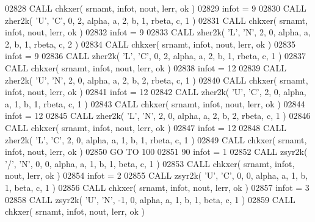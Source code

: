 \begin{DoxyCode}
02828       \textcolor{keyword}{CALL }chkxer( srnamt, infot, nout, lerr, ok )
02829       infot = 9
02830       \textcolor{keyword}{CALL }zher2k( \textcolor{stringliteral}{'U'}, \textcolor{stringliteral}{'C'}, 0, 2, alpha, a, 2, b, 1, rbeta, c, 1 )
02831       \textcolor{keyword}{CALL }chkxer( srnamt, infot, nout, lerr, ok )
02832       infot = 9
02833       \textcolor{keyword}{CALL }zher2k( \textcolor{stringliteral}{'L'}, \textcolor{stringliteral}{'N'}, 2, 0, alpha, a, 2, b, 1, rbeta, c, 2 )
02834       \textcolor{keyword}{CALL }chkxer( srnamt, infot, nout, lerr, ok )
02835       infot = 9
02836       \textcolor{keyword}{CALL }zher2k( \textcolor{stringliteral}{'L'}, \textcolor{stringliteral}{'C'}, 0, 2, alpha, a, 2, b, 1, rbeta, c, 1 )
02837       \textcolor{keyword}{CALL }chkxer( srnamt, infot, nout, lerr, ok )
02838       infot = 12
02839       \textcolor{keyword}{CALL }zher2k( \textcolor{stringliteral}{'U'}, \textcolor{stringliteral}{'N'}, 2, 0, alpha, a, 2, b, 2, rbeta, c, 1 )
02840       \textcolor{keyword}{CALL }chkxer( srnamt, infot, nout, lerr, ok )
02841       infot = 12
02842       \textcolor{keyword}{CALL }zher2k( \textcolor{stringliteral}{'U'}, \textcolor{stringliteral}{'C'}, 2, 0, alpha, a, 1, b, 1, rbeta, c, 1 )
02843       \textcolor{keyword}{CALL }chkxer( srnamt, infot, nout, lerr, ok )
02844       infot = 12
02845       \textcolor{keyword}{CALL }zher2k( \textcolor{stringliteral}{'L'}, \textcolor{stringliteral}{'N'}, 2, 0, alpha, a, 2, b, 2, rbeta, c, 1 )
02846       \textcolor{keyword}{CALL }chkxer( srnamt, infot, nout, lerr, ok )
02847       infot = 12
02848       \textcolor{keyword}{CALL }zher2k( \textcolor{stringliteral}{'L'}, \textcolor{stringliteral}{'C'}, 2, 0, alpha, a, 1, b, 1, rbeta, c, 1 )
02849       \textcolor{keyword}{CALL }chkxer( srnamt, infot, nout, lerr, ok )
02850       \textcolor{keywordflow}{GO TO} 100
02851    90 infot = 1
02852       \textcolor{keyword}{CALL }zsyr2k( \textcolor{stringliteral}{'/'}, \textcolor{stringliteral}{'N'}, 0, 0, alpha, a, 1, b, 1, beta, c, 1 )
02853       \textcolor{keyword}{CALL }chkxer( srnamt, infot, nout, lerr, ok )
02854       infot = 2
02855       \textcolor{keyword}{CALL }zsyr2k( \textcolor{stringliteral}{'U'}, \textcolor{stringliteral}{'C'}, 0, 0, alpha, a, 1, b, 1, beta, c, 1 )
02856       \textcolor{keyword}{CALL }chkxer( srnamt, infot, nout, lerr, ok )
02857       infot = 3
02858       \textcolor{keyword}{CALL }zsyr2k( \textcolor{stringliteral}{'U'}, \textcolor{stringliteral}{'N'}, -1, 0, alpha, a, 1, b, 1, beta, c, 1 )
02859       \textcolor{keyword}{CALL }chkxer( srnamt, infot, nout, lerr, ok )

\end{DoxyCode}
